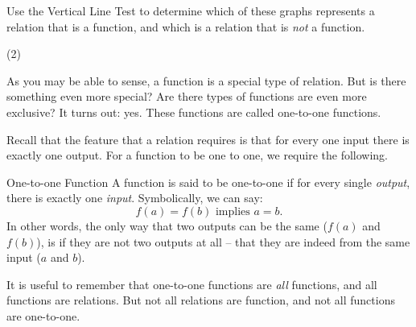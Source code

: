 \documentclass[12pt,fleqn]{book}
\begin{document}
Use the Vertical Line Test to determine which of these graphs represents a relation that is a function, and which is a relation that is \emph{not} a function.
\begin{tasks}(2)
    \task {}
    \task {}
    \task {}
    \task {}
    \task {}
    \task {}
    \task {}
    \task {}
\end{tasks}

As you may be able to sense, a function is a special type of relation.  But is there something even more special?  Are there types of functions are even more exclusive?  It turns out: yes.  These functions are called one-to-one functions.

Recall that the feature that a relation requires is that for every one input there is exactly one output. For a function to be one to one, we require the following.
\begin{defn}{One-to-one Function}{}
    A function is said to be one-to-one if for every single \emph{output}, there is exactly one \emph{input}.  Symbolically, we can say:
    \[
        f(a)=f(b) \text{ implies } a=b.
    \]
    In other words, the only way that two outputs can be the same ($f(a)$ and $f(b)$), is if they are not two outputs at all -- that they are indeed from the same input ($a$ and $b$).
\end{defn}

It is useful to remember that one-to-one functions are \emph{all} functions, and all functions are relations.  But not all relations are function, and not all functions are one-to-one.
\\[1em]
\end{document}
